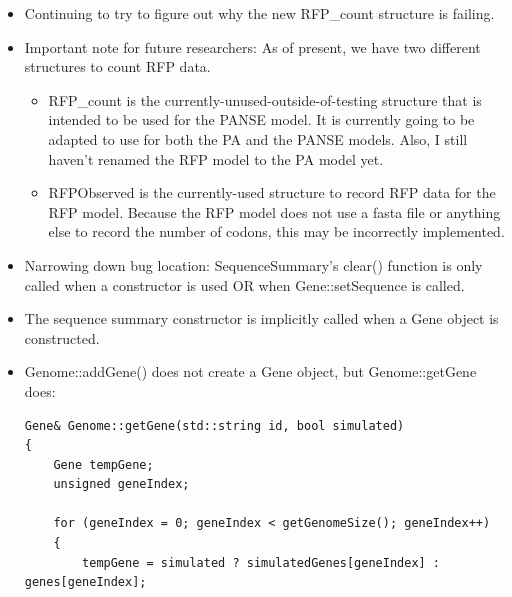 \documentclass[12pt,hyperref]{labbook}
\begin{document}
\begin{itemize}
    \item Continuing to try to figure out why the new RFP\_count structure is failing.
    \item Important note for future researchers: As of present, we have two different structures to count RFP data.
    \begin{itemize}
        \item RFP\_count is the currently-unused-outside-of-testing structure that is intended to be used for the PANSE model.
        It is currently going to be adapted to use for both the PA and the PANSE models.
        Also, I still haven't renamed the RFP model to the PA model yet.
        \item RFPObserved is the currently-used structure to record RFP data for the RFP model.
        Because the RFP model does not use a fasta file or anything else to record the number of codons, this may be incorrectly implemented.
    \end{itemize}
    \item Narrowing down bug location: SequenceSummary's clear() function is only called when a constructor is used OR when Gene::setSequence is called.
    \item The sequence summary constructor is implicitly called when a Gene object is constructed.
    \item Genome::addGene() does not create a Gene object, but Genome::getGene does:
    \begin{lstlisting}
Gene& Genome::getGene(std::string id, bool simulated)
{
	Gene tempGene;
	unsigned geneIndex;

	for (geneIndex = 0; geneIndex < getGenomeSize(); geneIndex++)
	{
		tempGene = simulated ? simulatedGenes[geneIndex] : genes[geneIndex];


\end{lstlisting}
\end{itemize}
\end{document}
